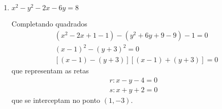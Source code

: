 \begin{exemplos}
\begin{enumerate}
\begin{solucao}
\begin{align*}
        &(x^2 - 6x + 9 - 9) - 2(y^2 + 4y + 4 - 4) - 1 = 0\\
        &(x - 3)^2 - 2(y + 2)^2 = 2.
      \end{align*}
      Fazendo
      \begin{align*}
        x - 3 = x_1\\
        y + 2 = y_1
      \end{align*}
      obtemos
      \[
        \dfrac{x_1^2}{2} - y_1^2 = 1
      \]
      que representa uma hip\'erbole com focos no eixo $x_1$. Suas ass{\'\i}ntotas s\~ao
      \[
        y_1 = \pm \dfrac{x_1}{\sqrt{2}}.
      \]
      Os v\'ertices s\~ao $\overline{A_1}(-\sqrt{2},0)$ e $\overline{A_2}(\sqrt{2},0)$.
      No sistema original suas ass{\'\i}ntotas s\~ao
      \begin{align*}
        y = \dfrac{x}{\sqrt{2}} - \left(\dfrac{3}{\sqrt{2}} + 2\right)\\
        y = -\dfrac{x}{\sqrt{2}} + \left(\dfrac{3}{\sqrt{2}} - 2\right).
      \end{align*}
      Os v\'ertices s\~ao $\overline{A_1}(-3 - \sqrt{2},0)$ e $\overline{A_2}(-3 + \sqrt{2},0)$.
       \begin{figure}[!h]
        \centering
        \caption{Hip\'erbole $x^2 - 2y^2 - 6x - 8y - 1 = 0$}
        \texttt{[image: hiperbole-eixos-tranladados.pdf]}
      \end{figure}
    \end{solucao}
    \item $x^2 - y^2 - 2x - 6y = 8$
    \begin{solucao}
      Completando quadrados
      \begin{align*}
        &(x^2 - 2x + 1 - 1) - (y^2 + 6y + 9 - 9) - 1 = 0\\
        &(x - 1)^2 - (y + 3)^2 = 0\\
        &[(x - 1) - (y + 3)][(x - 1) + (y + 3)] = 0
      \end{align*}
      que representam as retas
      \begin{align*}
        r: x - y - 4 = 0\\
        s: x + y + 2 = 0
      \end{align*}
      que se interceptam no ponto $(1,-3)$.
    \end{solucao}
  \end{enumerate}
\end{exemplos}

